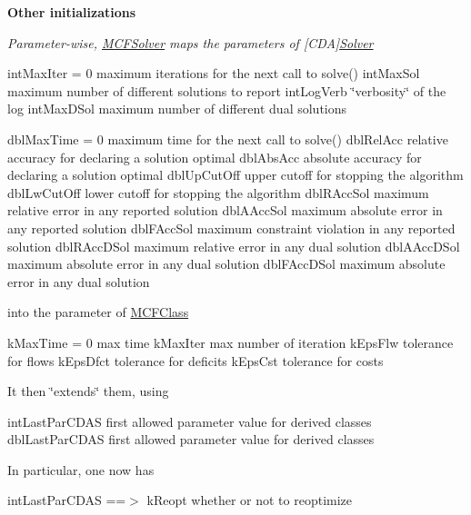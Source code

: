 \begin{Indent}\textbf{ Other initializations}\par
{\em Parameter-\/wise, \mbox{\hyperlink{class_s_m_spp__di__unipi__it_1_1_m_c_f_solver}{M\+C\+F\+Solver}} maps the parameters of \mbox{[}C\+DA\mbox{]}\mbox{\hyperlink{class_s_m_spp__di__unipi__it_1_1_solver}{Solver}}

int\+Max\+Iter = 0 maximum iterations for the next call to solve() int\+Max\+Sol maximum number of different solutions to report int\+Log\+Verb \char`\"{}verbosity\char`\"{} of the log int\+Max\+D\+Sol maximum number of different dual solutions

dbl\+Max\+Time = 0 maximum time for the next call to solve() dbl\+Rel\+Acc relative accuracy for declaring a solution optimal dbl\+Abs\+Acc absolute accuracy for declaring a solution optimal dbl\+Up\+Cut\+Off upper cutoff for stopping the algorithm dbl\+Lw\+Cut\+Off lower cutoff for stopping the algorithm dbl\+R\+Acc\+Sol maximum relative error in any reported solution dbl\+A\+Acc\+Sol maximum absolute error in any reported solution dbl\+F\+Acc\+Sol maximum constraint violation in any reported solution dbl\+R\+Acc\+D\+Sol maximum relative error in any dual solution dbl\+A\+Acc\+D\+Sol maximum absolute error in any dual solution dbl\+F\+Acc\+D\+Sol maximum absolute error in any dual solution

into the parameter of \mbox{\hyperlink{class_m_c_f_class}{M\+C\+F\+Class}}

k\+Max\+Time = 0 max time k\+Max\+Iter max number of iteration k\+Eps\+Flw tolerance for flows k\+Eps\+Dfct tolerance for deficits k\+Eps\+Cst tolerance for costs

It then \char`\"{}extends\char`\"{} them, using

int\+Last\+Par\+C\+D\+AS first allowed parameter value for derived classes dbl\+Last\+Par\+C\+D\+AS first allowed parameter value for derived classes

In particular, one now has

int\+Last\+Par\+C\+D\+AS ==$>$ k\+Reopt whether or not to reoptimize

}
\end{Indent}
